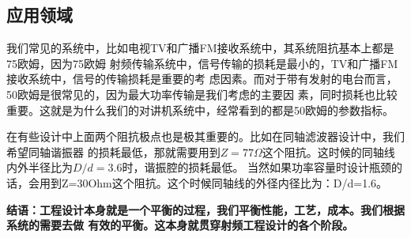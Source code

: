 \subsection{应用领域}
我们常见的系统中，比如电视TV和广播FM接收系统中，其系统阻抗基本上都是75欧姆，因为75欧姆
射频传输系统中，信号传输的损耗是最小的，TV和广播FM接收系统中，信号的传输损耗是重要的考
虑因素。而对于带有发射的电台而言，50欧姆是很常见的，因为最大功率传输是我们考虑的主要因
素，同时损耗也比较重要。这就是为什么我们的对讲机系统中，经常看到的都是50欧姆的参数指标。

在有些设计中上面两个阻抗极点也是极其重要的。比如在同轴滤波器设计中，我们希望同轴谐振器
的损耗最低，那就需要用到$ Z=77\Omega$这个阻抗。这时候的同轴线内外半径比为$D/d=3.6$时，谐振腔的损耗最低。
当然如果功率容量时设计瓶颈的话，会用到Z=30Ohm这个阻抗。这个时候同轴线的外径内径比为：D/d=1.6。

\textbf{结语：工程设计本身就是一个平衡的过程，我们平衡性能，工艺，成本。我们根据系统的需要去做
    有效的平衡。这本身就贯穿射频工程设计的各个阶段。}
